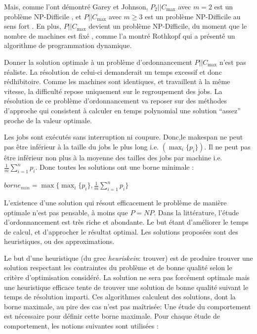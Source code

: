 \documentclass[a4paper,12pt]{report}
\theoremstyle{plain}				%
\theoremstyle{definition}				%
\newcommand\problemGrahamPII{$P_2||C_{\max}$\xspace}	%
\newcommand\problemGrahamP{$P||C_{\max}$\xspace}
\newcommand{\fco}[1]{\todo[author=FCO,color=teal,inline]{#1}}
\begin{document}
Mais, comme l'ont démontré Garey et Johnson, 
  \problemGrahamPII avec $m = 2$ est un problème NP-Difficile \cite{garey1978strong}, et 
  \problemGrahamP avec $m \geq 3$ est un problème NP-Difficile au sens fort \cite{garey1982computers}.
En plus, \problemGrahamP devient un problème NP-Difficile, du moment que le nombre de machines 
  est fixé \cite{chen1999potts}, comme l'a montré Rothkopf \cite{rothkopf1966scheduling} qui a 
  présenté un algorithme de programmation dynamique.\fco{voir le type d'algo pseudo-polynomial ?}

Donner la solution optimale à un problème d'ordonnancement \problemGrahamP n'est pas réaliste. 
La résolution de celui-ci demanderait un temps excessif et donc rédhibitoire.
Comme les machines sont identiques, et travaillent à la même vitesse, la difficulté repose uniquement 
  sur le regroupement des jobs.
La résolution de ce problème d'ordonnancement va reposer sur des méthodes d'approche qui consistent à 
  calculer en temps polynomial une solution ``assez'' proche de la valeur optimale.

Les jobs sont exécutés sans interruption ni coupure. Donc,le makespan ne peut pas être inférieur à 
  la taille du jobs le plus long i.e. $(\max_i\{p_i\})$.
  Il ne peut pas être inférieur non plus à la moyenne des tailles des jobs par machine
  i.e. $\frac{1}{m} \sum_{i=1}^{n} p_i$.
Donc toutes les solutions ont une borne minimale \cite{mcnaughton1959scheduling}: \\

  \begin{center}
  $borne_{min} = \max \{ \max_i\{p_i\}, \frac{1}{m} \sum_{i=1}^{n} p_i \}$
  \label{borneMini}
  \end{center}

L'existence d'une solution qui résout efficacement le problème de manière optimale
  n'est pas pensable, à moins que $P = NP$.
Dans la littérature, l'étude d'ordonnancement est très riche et abondante. 
Le but étant d'améliorer le temps de calcul, et d'approcher le résultat optimal. 
Les solutions proposées sont des heuristiques, ou des approximations.

Le but d'une heuristique (du grec \emph{heuriskein}: trouver) est 
  de produire trouver une solution respectant les contraintes du problème et 
  de bonne qualité selon le critère d'optimisation considéré. 
La solution ne sera pas forcément optimale mais une heuristique efficace tente de trouver une 
  solution de bonne qualité suivant le temps de résolution imparti.
Ces algorithmes calculent des solutions, dont la borne maximale, au pire des cas n'est pas maîtrisée: 
Une étude du comportement est nécessaire pour définir cette borne maximale.  
Pour chaque étude de comportement, les notions suivantes sont utilisées :
\end{document}
